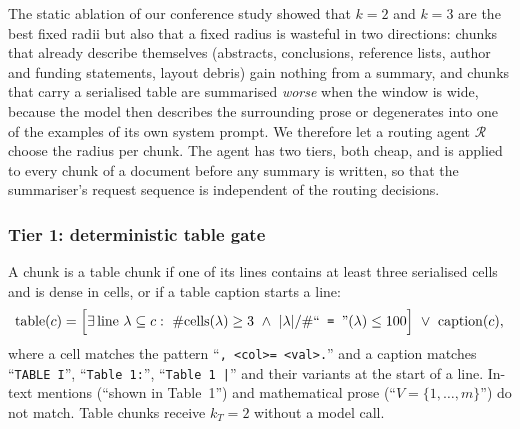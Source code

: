 \documentclass[pdflatex,sn-mathphys-num]{sn-jnl}
\theoremstyle{thmstyleone}%
\theoremstyle{thmstylethree}%
\begin{document}
The static ablation of our conference study \cite{sandor2025documentslicecontextualretrieval} showed that $k=2$ and $k=3$ are the best fixed radii but also that a fixed radius is wasteful in two directions: chunks that already describe themselves (abstracts, conclusions, reference lists, author and funding statements, layout debris) gain nothing from a summary, and chunks that carry a serialised table are summarised \emph{worse} when the window is wide, because the model then describes the surrounding prose or degenerates into one of the examples of its own system prompt. We therefore let a routing agent $\mathcal R$ choose the radius per chunk. The agent has two tiers, both cheap, and is applied to every chunk of a document before any summary is written, so that the summariser's request sequence is independent of the routing decisions.

\subsubsection{Tier 1: deterministic table gate}
A chunk is a table chunk if one of its lines contains at least three serialised cells and is dense in cells, or if a table caption starts a line:
\begin{equation}\label{eq:gate}
\mathrm{table}(c)=\Bigl[\exists\,\text{line }\lambda\subseteq c:\ \#\mathrm{cells}(\lambda)\ge 3 \ \wedge\ |\lambda|/\#\text{``\texttt{ = }''}(\lambda)\le 100\Bigr]\ \vee\ \mathrm{caption}(c),
\end{equation}
where a cell matches the pattern ``\texttt{, \textless col\textgreater = \textless val\textgreater.}'' and a caption matches ``\texttt{TABLE I}'', ``\texttt{Table 1:}'', ``\texttt{Table 1 |}'' and their variants at the start of a line. In-text mentions (``shown in Table~1'') and mathematical prose (``$V=\{1,\dots,m\}$'') do not match. Table chunks receive $k_T=2$ without a model call.
\end{document}
